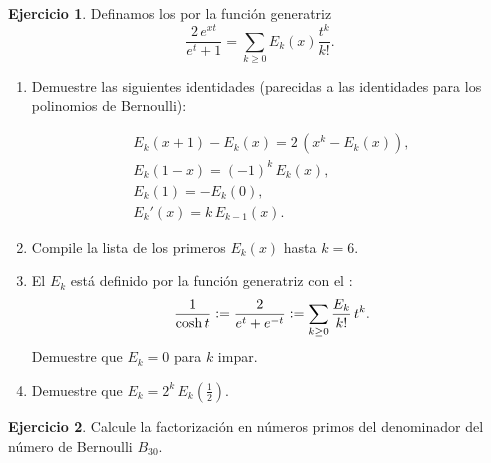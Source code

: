 \documentclass{article}
\theoremstyle{definition}
\newtheorem{ejerc}{Ejercicio}
\begin{document}
\begin{ejerc}
Definamos los  por la función generatriz
$$\frac{2\,e^{xt}}{e^t+1}= \sum_{k\ge 0} E_k (x) \frac{t^k}{k!}.$$

\begin{enumerate}
\item Demuestre las siguientes identidades (parecidas a las identidades para los polinomios de Bernoulli):

\begin{gather*}
E_k (x+1) - E_k (x) = 2\,(x^k - E_k (x)),\\
E_k (1-x) = (-1)^k \, E_k (x),\\
E_k (1) = -E_k (0),\\
E_k' (x) = k\,E_{k-1} (x).
\end{gather*}

\item Compile la lista de los primeros $E_k (x)$ hasta $k = 6$.

\item El  $E_k$ está definido por la función generatriz con el :
$$\frac{1}{\cosh t} \mathrel{\mathop:}= \frac{2}{e^t + e^{-t}} \mathrel{\mathop:}= \sum_{k \ge 0} \frac{E_k}{k!} \, t^k.$$
Demuestre que $E_k = 0$ para $k$ impar.

\item Demuestre que $E_k = 2^k \, E_k \left(\frac{1}{2}\right)$.
\end{enumerate}
\end{ejerc}

\begin{ejerc}
Calcule la factorización en números primos del denominador del número de Bernoulli $B_{30}$.
\end{ejerc}
\end{document}
